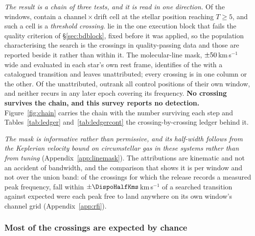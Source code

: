 \emph{The result is a chain of three tests, and it is read in one direction.}
Of the \NWindows{} windows, \EvNCrossRaw{} contain a
channel\,$\times$\,drift cell at the stellar position reaching $T\geq5$, and
such a cell is a \emph{threshold crossing}. \EvNCrossFlag{} lie in the one
execution block that fails the quality criterion of \S\ref{sec:bdblock},
fixed before it was applied, so the population characterising the search is
the \EvNCrossQp{} crossings in quality-passing data and those
\EvNCrossFlag{} are reported beside it rather than within it. The
molecular-line mask,
$\pm50$\,km\,s$^{-1}$ wide and evaluated in each star's own rest
frame, identifies \EvNAttrQp{} of the \EvNCrossQp{} with a catalogued
transition and leaves \EvNUnattrQp{} unattributed; every crossing is in one
column or the other. Of the unattributed, \EvNRankQp{} outrank all
\NCtrl{} control positions of their own window, and neither recurs in any
later epoch covering its frequency. \textbf{No crossing survives the chain,
and this survey reports no detection.}
Figure~\ref{fig:chain} carries the chain with the number surviving each
step and Tables~\ref{tab:ledger} and~\ref{tab:ledgercont} the
crossing-by-crossing ledger behind it.

\emph{The mask is informative rather than permissive, and its half-width
follows from the Keplerian velocity bound on circumstellar gas in these
systems rather than from tuning} (Appendix~\ref{app:linemask}). The
attributions are kinematic and not an accident of bandwidth, and the
comparison that shows it is per window and not over the union band: of the
\AppMNCrossF{} crossings for which the release records a measured peak
frequency, \AppMTubeObs{} fall within $\pm\DispoHalfKms$\,km\,s$^{-1}$ of a
searched transition against \AppMTubeNull{} expected were each peak free to
land anywhere on its own window's channel grid (Appendix~\ref{app:rfi}).

\subsubsection{Most of the crossings are expected by chance}
\label{sec:trigunif}

